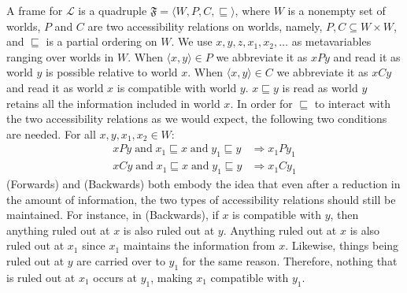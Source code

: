 A frame for $\mathcal{L}$ is a quadruple $\mathfrak{F} = \langle W, P, C, \sqsubseteq \rangle$, where $W$ is a nonempty set of worlds, $P$ and $C$ are two accessibility relations on worlds, namely, $P, C \subseteq W \times W$, and $\sqsubseteq$ is a partial ordering on $W$. We use $x, y, z, x_1, x_2, \dots$ as metavariables ranging over worlds in $W$. When $\langle x, y \rangle \in P$ we abbreviate it as $xPy$ and read it as world $y$ is possible relative to world $x$. When $\langle x, y \rangle \in C$ we abbreviate it as $xCy$ and read it as world $x$ is compatible with world $y$. $x \sqsubseteq y$ is read as world $y$ retains all the information included in world $x$. In order for $\sqsubseteq$ to interact with the two accessibility relations as we would expect, the following two conditions are needed. For all $x, y, x_1, x_2 \in W$:
\leqnomode
\begin{align}
  xPy \;\textrm{and}\; x_1 \sqsubseteq x \;\textrm{and}\; y_1 \sqsubseteq y &\Rightarrow x_1 P y_1 \tag{Forwards} \\
  xCy \;\textrm{and}\; x_1 \sqsubseteq x \;\textrm{and}\; y_1 \sqsubseteq y &\Rightarrow x_1 C y_1 \tag{Backwards}
\end{align}
(Forwards) and (Backwards) both embody the idea that even after a reduction in the amount of information, the two types of accessibility relations should still be maintained. For instance, in (Backwards), if $x$ is compatible with $y$, then anything ruled out at $x$ is also ruled out at $y$. Anything ruled out at $x$ is also ruled out at $x_1$ since $x_1$ maintains the information from $x$. Likewise, things being ruled out at $y$ are carried over to $y_1$ for the same reason. Therefore, nothing that is ruled out at $x_1$ occurs at $y_1$, making $x_1$ compatible with $y_1$.

